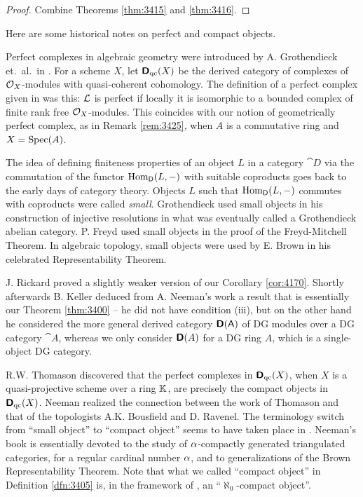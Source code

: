 \begin{proof}
Combine Theorems \ref{thm:3415} and \ref{thm:3416}.
\end{proof}

\begin{rem} \label{rem:3426}
Here are some historical notes on perfect and compact objects.

Perfect complexes in algebraic geometry were introduced by A. Grothen\-dieck 
et.\ al.\ in \cite{SGA6}. For a scheme $X$, let $\boldsymbol{\mathsf{D}}_{\mathrm{qc}}(X)$
be the derived category  of complexes of $\mathcal{O}_X$-modules with 
quasi-coherent cohomology. The definition of a perfect complex given in 
\cite{SGA6} was this: $\mathcal{L}$ is perfect if locally it is isomorphic to a bounded 
complex of finite rank free $\mathcal{O}_X$-modules. This coincides with our notion of 
geometrically perfect complex, as in Remark \ref{rem:3425}, when $A$ is a 
commutative ring and $X = \operatorname{Spec}(A)$.

The idea of defining finiteness properties of an object $L$ in a category 
$\cat{D}$ via the commutation of the functor $\operatorname{Hom}_{\operatorname{\mathsf{D}}}(L, -)$ with 
suitable coproducts goes back to the early days of category theory. Objects $L$ 
such that $\operatorname{Hom}_{\operatorname{\mathsf{D}}}(L, -)$ commutes with coproducts were called 
{\em small}. Grothendieck \cite{Gro} used small objects in his construction of 
injective resolutions in what was eventually called a Grothendieck abelian 
category. P. Freyd \cite{Fre} used small objects in the proof of the 
Freyd-Mitchell Theorem. In algebraic topology, small objects were used by E. 
Brown \cite{Brown} in his celebrated Representability Theorem.

J. Rickard \cite{Ric1} proved a slightly weaker version of our Corollary 
\ref{cor:4170}. Shortly afterwards B. Keller \cite{Kel1} deduced from A. 
Neeman's work \cite{Ne0} a result that 
is essentially our Theorem \ref{thm:3400} -- he did not have condition (iii), 
but on the other hand he considered the more general derived category 
$\boldsymbol{\mathsf{D}}(\operatorname{\mathsf{A}})$ of DG modules over a DG category $\cat{A}$, whereas we only 
consider $\boldsymbol{\mathsf{D}}(A)$ for a DG ring $A$, which is a single-object DG category. 

R.W. Thomason \cite{Thom} discovered that the perfect complexes in 
$\boldsymbol{\mathsf{D}}_{\mathrm{qc}}(X)$, when $X$ is a quasi-projective scheme over a 
ring $\mathbb{K}$, are precisely the compact objects in $\boldsymbol{\mathsf{D}}_{\mathrm{qc}}(X)$. 
Neeman \cite{Ne0} realized the connection between the work of Thomason and 
that of the topologists  A.K. Bousfield and D. Ravenel.
The terminology switch from ``small object'' to ``compact object'' seems to 
have taken place in \cite{Ne0}. 
Neeman's book \cite{Ne1} is  essentially devoted 
to the study of $\alpha$-compactly generated triangulated categories, for a 
regular cardinal number $\alpha$, and to generalizations of the Brown 
Representability Theorem. Note that what we called ``compact object'' in 
Definition \ref{dfn:3405} is, in the framework of \cite{Ne0}, an 
``$\aleph_0$-compact object''. 


\end{rem}
